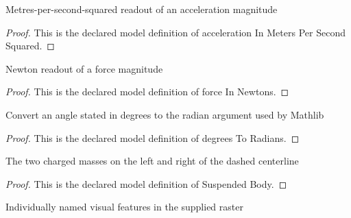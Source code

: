 \begin{definition}
  \label{def:physics:phyx-mini-0902:phyxminiproblems-problemphyxmini0902-accelerationinmeterspersecondsquared}
  Metres-per-second-squared readout of an acceleration magnitude
\end{definition}
\begin{proof}
  This is the declared model definition of acceleration In Meters Per Second Squared.
\end{proof}
\begin{definition}
  \label{def:physics:phyx-mini-0902:phyxminiproblems-problemphyxmini0902-forceinnewtons}
  Newton readout of a force magnitude
\end{definition}
\begin{proof}
  This is the declared model definition of force In Newtons.
\end{proof}
\begin{definition}
  \label{def:physics:phyx-mini-0902:phyxminiproblems-problemphyxmini0902-degreestoradians}
  Convert an angle stated in degrees to the radian argument used by Mathlib
\end{definition}
\begin{proof}
  This is the declared model definition of degrees To Radians.
\end{proof}
\begin{definition}
  \label{def:physics:phyx-mini-0902:phyxminiproblems-problemphyxmini0902-suspendedbody}
  The two charged masses on the left and right of the dashed centerline
\end{definition}
\begin{proof}
  This is the declared model definition of Suspended Body.
\end{proof}
\begin{definition}
  \label{def:physics:phyx-mini-0902:phyxminiproblems-problemphyxmini0902-figurefeature}
  Individually named visual features in the supplied raster
\end{definition}
